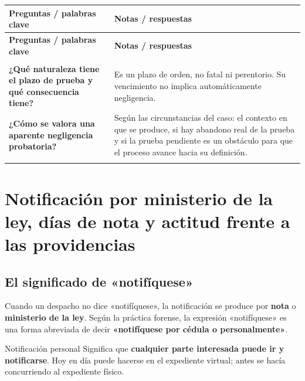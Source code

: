 \documentclass[12pt,oneside]{book}
\newlength{\cornellizq}
\newlength{\cornellder}
\newenvironment{cornell}
{\begin{longtable}{>{\columncolor{gray!10}\raggedright\arraybackslash}p{\cornellizq}>{\raggedright\arraybackslash}p{\cornellder}}
\toprule
\textbf{Preguntas / palabras clave} & \textbf{Notas / respuestas} \\
\midrule
\endfirsthead
\toprule
\textbf{Preguntas / palabras clave} & \textbf{Notas / respuestas} \\
\midrule
\endhead
\midrule
\multicolumn{2}{r}{\footnotesize\itshape Continúa en la página siguiente} \\
\endfoot
\endlastfoot}
{\end{longtable}}
\begin{document}
\begin{cornell}
\addlinespace
\midrule[0.3pt]
\textbf{¿Qué naturaleza tiene el plazo de prueba y qué consecuencia tiene?} &
Es un plazo de orden, no fatal ni perentorio. Su vencimiento no implica automáticamente negligencia. \\
\addlinespace
\midrule[0.3pt]
\textbf{¿Cómo se valora una aparente negligencia probatoria?} &
Según las circunstancias del caso: el contexto en que se produce, si hay abandono real de la prueba y si la prueba pendiente es un obstáculo para que el proceso avance hacia su definición. \\
\addlinespace
\midrule
\rowcolor{blue!5}
\multicolumn{2}{>{\raggedright\arraybackslash}p{\dimexpr\cornellizq+\cornellder+2\tabcolsep\relax}}{%
\textbf{Resumen.} Notificar al testigo, preferentemente por escrito firmado, es una buena práctica que evita perder la prueba y responde al principio de diligencia. Para audiencias virtuales conviene contar con un celular con datos como respaldo. El plazo de prueba es de orden: su vencimiento no configura por sí solo negligencia, que debe evaluarse según las circunstancias (abandono real y obstáculo para la definición del proceso).} \\
\bottomrule
\end{cornell}

\chapter[Notificación por ministerio de la ley]{Notificación por ministerio de la ley, días de nota y actitud frente a las providencias}

\section{El significado de «notifíquese»}

Cuando un despacho no dice «notifíquese», la notificación se produce por \textbf{nota} o \textbf{ministerio de la ley}. Según la práctica forense, la expresión «notifíquese» es una forma abreviada de decir \textbf{«notifíquese por cédula o personalmente»}.

\begin{definition}{Notificación personal}
Significa que \textbf{cualquier parte interesada puede ir y notificarse}. Hoy en día puede hacerse en el expediente virtual; antes se hacía concurriendo al expediente físico.
\end{definition}
\end{document}
